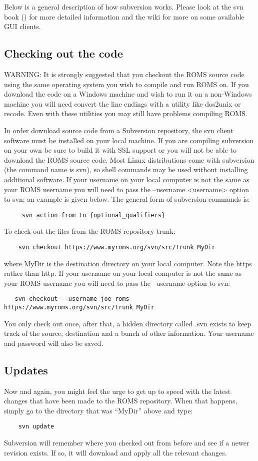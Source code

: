Below is a general description of how subversion works. Please look
at the svn book (\cite{SVN}) for more detailed information and the wiki
for more on some available GUI clients.

\subsection{Checking out the code}
WARNING: It is strongly suggested that you checkout the ROMS source
code using the same operating system you wish to compile and run
ROMS on. If you download the code on a Windows machine and wish to
run it on a non-Windows machine you will need convert the line
endings with a utility like dos2unix or recode. Even with these
utilities you may still have problems compiling ROMS.

In order download source code from a Subversion repository, the svn
client software must be installed on your local machine. If you are
compiling subversion on your own be sure to build it with SSL
support or you will not be able to download the ROMS source code.
Most Linux distributions come with subversion (the command name is
svn), so shell commands may be used without installing additional
software. If your username on your local computer is not the same as
your ROMS username you will need to pass the --username <username>
option to svn; an example is given below. The general form of
subversion commands is: 
\begin{verbatim}
     svn action from to {optional_qualifiers} 
\end{verbatim}
To check-out the files from the ROMS repository trunk:
\begin{verbatim}
    svn checkout https://www.myroms.org/svn/src/trunk MyDir
\end{verbatim}
where MyDir is the destination directory on your local computer.
Note the https rather than http. If your username on your local
computer is not the same as your ROMS username you will need to pass
the --username option to svn:
\begin{verbatim}
   svn checkout --username joe_roms https://www.myroms.org/svn/src/trunk MyDir
\end{verbatim}
You only check out once, after that, a hidden directory called .svn
exists to keep track of the source, destination and a bunch of other
information. Your username and password will also be saved.

\subsection{Updates}
Now and again, you might feel the urge to get up to speed with the
latest changes that have been made to the ROMS repository. When that
happens, simply go to the directory that was ``MyDir'' above and
type:
\begin{verbatim}
    svn update
\end{verbatim}
Subversion will remember where you checked out from before and
see if a newer revision exists. If so, it will download and apply
all the relevant changes.

